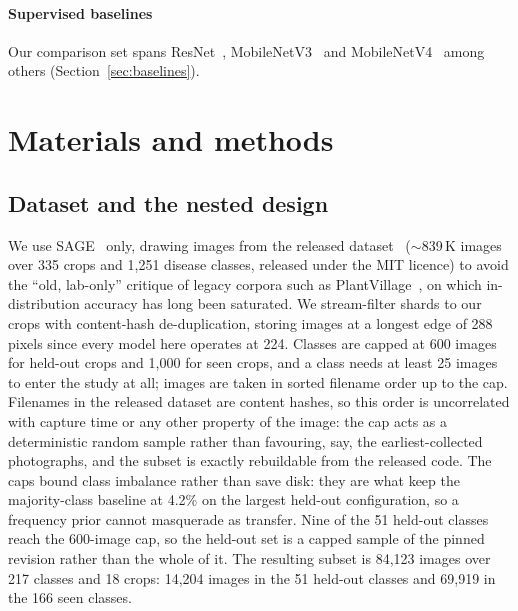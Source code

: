 \documentclass[a4paper,fleqn]{cas-dc}
\begin{document}
\paragraph{Supervised baselines} Our comparison set spans ResNet~\citep{he2016},
MobileNetV3~\citep{howard2019} and MobileNetV4~\citep{qin2024} among others
(Section~\ref{sec:baselines}).

\section{Materials and methods}

\subsection{Dataset and the nested design}
\label{sec:data}

We use SAGE~\citep{arshad2026sage} only, drawing images from the released
dataset~\citep{sagedata2026} ($\sim$839\,K images over 335 crops and 1{,}251 disease classes,
released under the MIT licence) to avoid the
``old, lab-only'' critique of legacy corpora such as PlantVillage~\citep{mohanty2016}, on which
in-distribution accuracy has long been saturated. We stream-filter shards to our crops with
content-hash de-duplication, storing images at a longest edge of 288 pixels since every model
here operates at 224. Classes are capped at 600 images for held-out crops and 1{,}000 for seen
crops, and a class needs at least 25 images to enter the study at all; images are taken in sorted
filename order up to the cap. Filenames in the released dataset are content hashes, so this order
is uncorrelated with capture time or any other property of the image: the cap acts as a
deterministic random sample rather than favouring, say, the earliest-collected photographs, and
the subset is exactly rebuildable from the released code. The caps bound class imbalance rather than save disk: they are what keep the majority-class
baseline at 4.2\% on the largest held-out configuration, so a frequency prior cannot masquerade as
transfer. Nine of the 51 held-out classes reach the 600-image cap, so the held-out set is a
capped sample of the pinned revision rather than the whole of it. The resulting subset is 84{,}123
images over 217 classes and 18 crops: 14{,}204 images in the 51 held-out classes and 69{,}919 in
the 166 seen classes.
\end{document}
